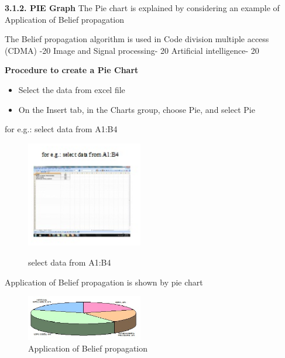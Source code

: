 \textbf{3.1.2. PIE Graph}
The Pie chart is explained by considering an example of Application of Belief propagation

The Belief propagation algorithm is used in Code division multiple access (CDMA) -20%
Image and Signal processing- 20%
Artificial intelligence- 20%

\textbf{Procedure to create a Pie Chart}
 \begin{itemize}
   \item Select the data from excel file
   \item On the Insert tab, in the Charts group, choose Pie, and select Pie
 \end{itemize}

 for e.g.: select data from A1:B4
\begin{figure}
  \includegraphics[width=2in]{figure6.eps} \cite { Stephen Moffat}
  \caption {select data from A1:B4}\label{3.6}
\end{figure}


Application of Belief propagation is shown by pie chart

\begin{figure}
  \includegraphics[width=2in]{figure7.eps}
  \caption {Application of Belief propagation}\label{3.7}
\end{figure}




